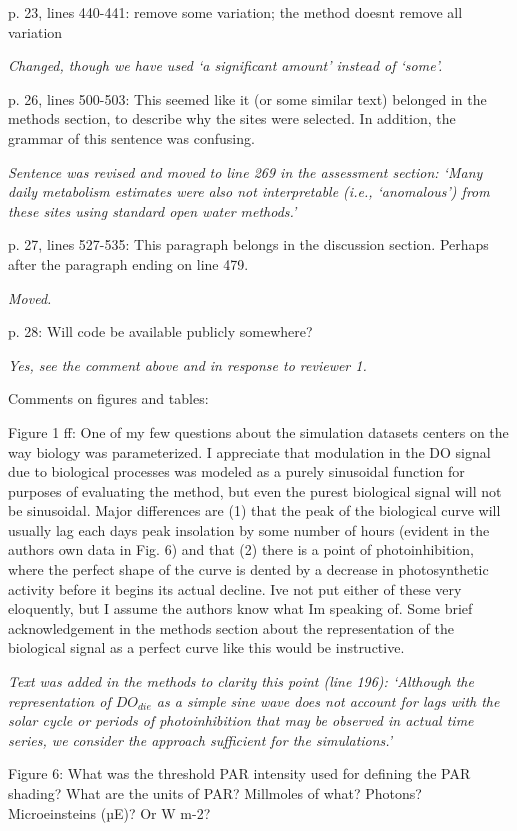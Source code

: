 \documentclass[letterpaper,12pt]{article}\usepackage[]{graphicx}\usepackage[]{color}
\begin{document}
p. 23, lines 440-441: remove some variation; the method doesnt remove all variation

{\it Changed, though we have used `a significant amount' instead of `some'.}

p. 26, lines 500-503: This seemed like it (or some similar text) belonged in the methods section, to describe why the sites were selected. In addition, the grammar of this sentence was confusing.

{\it Sentence was revised and moved to line 269 in the assessment section: `Many daily metabolism estimates were also not interpretable (i.e., `anomalous') from these sites using standard open water methods.'
}

p. 27, lines 527-535: This paragraph belongs in the discussion section. Perhaps after the paragraph ending on line 479.

{\it Moved.} 

p. 28: Will code be available publicly somewhere?

{\it Yes, see the comment above and in response to reviewer 1.}

Comments on figures and tables:

Figure 1 ff: One of my few questions about the simulation datasets centers on the way biology was parameterized. I appreciate that modulation in the DO signal due to biological processes was modeled as a purely sinusoidal function for purposes of evaluating the method, but even the purest biological signal will not be sinusoidal. Major differences are (1) that the peak of the biological curve will usually lag each days peak insolation by some number of hours (evident in the authors own data in Fig. 6) and that (2) there is a point of photoinhibition, where the perfect shape of the curve is dented by a decrease in photosynthetic activity before it begins its actual decline. Ive not put either of these very eloquently, but I assume the authors know what Im speaking of. Some brief acknowledgement in the methods section about the representation of the biological signal as a perfect curve like this would be instructive.

{\it Text was added in the methods to clarity this point (line 196): `Although the representation of $DO_{die}$ as a simple sine wave does not account for lags with the solar cycle or periods of photoinhibition that may be observed in actual time series, we consider the approach sufficient for the simulations.'}

Figure 6: What was the threshold PAR intensity used for defining the PAR shading? What are the units of PAR? Millmoles of what? Photons? Microeinsteins (µE)? Or W m-2?
\end{document}
